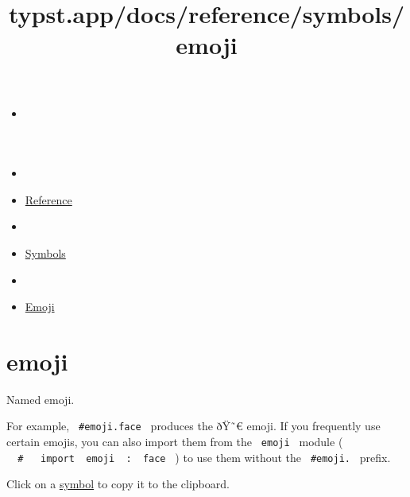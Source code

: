 \title{typst.app/docs/reference/symbols/emoji}

\begin{itemize}
\tightlist
\item
  \href{/docs}{}
\item
  
\item
  \href{/docs/reference/}{Reference}
\item
  
\item
  \href{/docs/reference/symbols/}{Symbols}
\item
  
\item
  \href{/docs/reference/symbols/emoji/}{Emoji}
\end{itemize}

\section{emoji}\label{emoji}

Named emoji.

For example, \texttt{\ \#emoji.face\ } produces the ðŸ˜€ emoji. If you
frequently use certain emojis, you can also import them from the
\texttt{\ emoji\ } module (
\texttt{\ }{\texttt{\ \#\ }}\texttt{\ }{\texttt{\ import\ }}\texttt{\ emoji\ }{\texttt{\ :\ }}\texttt{\ face\ }
) to use them without the \texttt{\ \#emoji.\ } prefix.

Click on a \href{/docs/reference/symbols/symbol/}{symbol} to copy it to
the clipboard.



